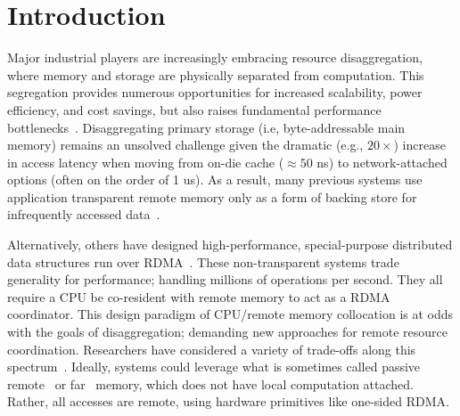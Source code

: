 \section{Introduction}
\label{sec:intro}

Major industrial players are increasingly embracing resource disaggregation,
where memory and storage are physically separated from computation. This
segregation provides numerous opportunities for increased scalability, power
efficiency, and cost savings, but also raises fundamental performance
bottlenecks~\cite{requirements}. Disaggregating primary storage (i.e,
byte-addressable main memory) remains an unsolved challenge given the
dramatic (e.g., $20\times$) increase in access latency when moving from
on-die cache ($\approx 50$ ns) to network-attached options (often on the
order of 1 us). As a result, many previous systems use application
transparent remote memory only as a form of backing store for infrequently
accessed data~\cite{job_throughput,infiniswap,leap,legoos}.


Alternatively, others have designed high-performance, special-purpose
distributed data structures run over
RDMA~\cite{farm,erpc,herd,fasst,pilaf,cell,sonuma,storm}. These
non-transparent systems trade generality for performance; handling millions
of operations per second. They all require a CPU be co-resident with remote
memory to act as a RDMA coordinator. This design paradigm of CPU/remote
memory collocation is at odds with the goals of disaggregation; demanding new
approaches for remote resource coordination. Researchers have considered a
variety of trade-offs along this spectrum~\cite{aguilera2019designing,
disandapp, amanda-hotnets,beyond,requirements}. Ideally, systems could
leverage what is sometimes called passive remote~\cite{clover} or
far~\cite{aguilera2019designing} memory, which does not have local
computation attached. Rather, all accesses are remote, using hardware
primitives like one-sided RDMA.

